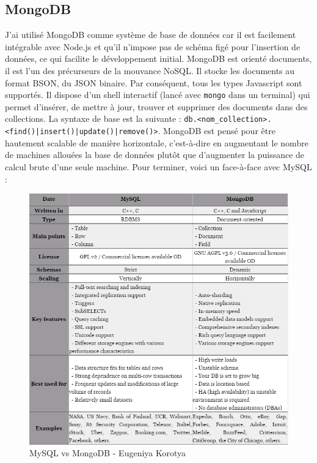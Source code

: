 \documentclass[a4paper, 12pt]{article}
\begin{document}
\subsection{MongoDB}
J'ai utilisé MongoDB comme système de base de données car il est facilement intégrable avec Node.js et qu'il n'impose
pas de schéma figé pour l'insertion de données, ce qui facilite le développement initial. MongoDB est orienté documents,
il est l'un des précurseurs de la mouvance NoSQL. Il stocke les documents au format BSON, du JSON binaire. Par conséquent,
tous les types Javascript sont supportés. Il dispose d'un shell interactif (lancé avec \texttt{mongo} dans
un terminal) qui permet d'insérer, de mettre à jour, trouver et supprimer des documents dans des collections. La syntaxe
de base est la suivante : \texttt{db.<nom_collection>.<find()|insert()|update()|remove()>}. MongoDB est pensé
pour être hautement scalable de manière horizontale, c'est-à-dire en augmentant le nombre de machines allouées la base de
données plutôt que d'augmenter la puissance de calcul brute d'une seule machine. Pour terminer, voici un face-à-face avec MySQL :
\begin{figure}
    \begin{center}
        \includegraphics[width=1\textwidth]{images/mysql_mongodb.png}
    \end{center}
    \caption{MySQL vs MongoDB - Eugeniya Korotya \cite{ref160}}
\end{figure}
\end{document}
